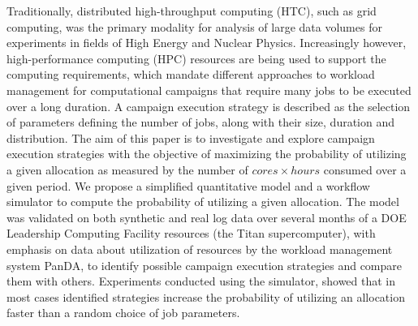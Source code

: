 Traditionally, distributed high-throughput \- computing (HTC), such as grid
computing, was the primary modality for analysis of large data volumes for
experiments in fields of High Energy and Nuclear Physics.
Increasingly however, high-performance computing (HPC) resources are being
used to support the computing requirements, which mandate different
approaches to workload management for computational campaigns that require
many jobs to be executed over a long duration.
A campaign execution strategy is described as the selection of parameters
defining the number of jobs, along with their size, duration and distribution.
The aim of this paper is to investigate and explore campaign execution
strategies with the objective of maximizing the probability of utilizing a
given allocation as measured by the number of $cores \times hours$ consumed
over a given period.
We propose a simplified quantitative model and a workflow simulator to compute
the probability of utilizing a given allocation.
The model was validated on both synthetic and real log data over several 
months of a DOE Leadership Computing Facility resources (the Titan 
supercomputer), with emphasis on data about utilization of resources by 
the workload management system PanDA, to identify possible campaign 
execution strategies and compare them with others.
Experiments conducted using the simulator, showed that in most cases
identified strategies increase the probability of utilizing an allocation
faster than a random choice of job parameters.


